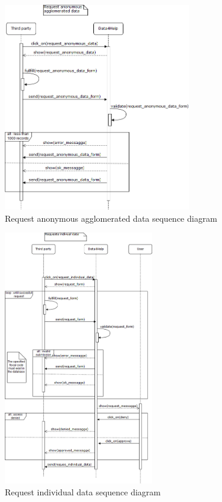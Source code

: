 \begin{figure}[H]
\includegraphics[width=\linewidth, height=9cm, keepaspectratio]{./Images/sequence_diag_request_anonymous_agglomerated_data.png}
\centering
\caption{Request anonymous agglomerated data sequence diagram}
\end{figure}

\begin{figure}[H]
\includegraphics[width=\linewidth, height=11cm, keepaspectratio]{./Images/sequence_diag_request_individual_data.png}
\centering
\caption{Request individual data sequence diagram}
\end{figure}

